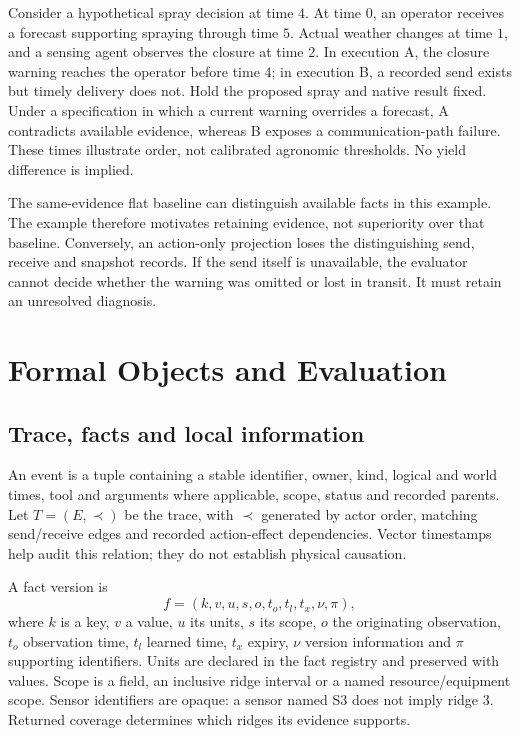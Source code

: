 \documentclass[sigconf,anonymous]{aamas}
\begin{document}
Consider a hypothetical spray decision at time $4$. At time $0$, an operator receives a forecast supporting spraying through time $5$. Actual weather changes at time $1$, and a sensing agent observes the closure at time $2$. In execution A, the closure warning reaches the operator before time $4$; in execution B, a recorded send exists but timely delivery does not. Hold the proposed spray and native result fixed. Under a specification in which a current warning overrides a forecast, A contradicts available evidence, whereas B exposes a communication-path failure. These times illustrate order, not calibrated agronomic thresholds. No yield difference is implied.

The same-evidence flat baseline can distinguish available facts in this example. The example therefore motivates retaining evidence, not superiority over that baseline. Conversely, an action-only projection loses the distinguishing send, receive and snapshot records. If the send itself is unavailable, the evaluator cannot decide whether the warning was omitted or lost in transit. It must retain an unresolved diagnosis.

\section{Formal Objects and Evaluation}
\subsection{Trace, facts and local information}
An event is a tuple containing a stable identifier, owner, kind, logical and world times, tool and arguments where applicable, scope, status and recorded parents. Let $T=(E,\prec)$ be the trace, with $\prec$ generated by actor order, matching send/receive edges and recorded action-effect dependencies. Vector timestamps help audit this relation; they do not establish physical causation.

A fact version is
\[
 f=(k,v,u,s,o,t_o,t_l,t_x,\nu,\pi),
\]
where $k$ is a key, $v$ a value, $u$ its units, $s$ its scope, $o$ the originating observation, $t_o$ observation time, $t_l$ learned time, $t_x$ expiry, $\nu$ version information and $\pi$ supporting identifiers. Units are declared in the fact registry and preserved with values. Scope is a field, an inclusive ridge interval or a named resource/equipment scope. Sensor identifiers are opaque: a sensor named S3 does not imply ridge 3. Returned coverage determines which ridges its evidence supports.
\end{document}
